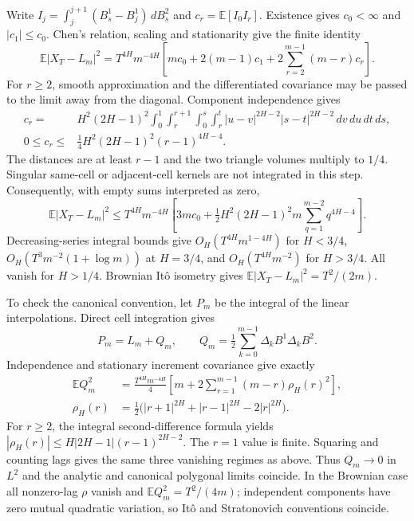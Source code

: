 \documentclass[11pt]{article}
\newcommand{\E}{\mathbb E}
\begin{document}
Write $I_j=\int_j^{j+1}(B^1_s-B^1_j)\,dB^2_s$ and $c_r=\E[I_0I_r]$. Existence gives $c_0<\infty$ and $|c_1|\le c_0$. Chen's relation, scaling and stationarity give the finite identity
\begin{equation}
\E|X_T-L_m|^2=T^{4H}m^{-4H}
\left[mc_0+2(m-1)c_1+2\sum_{r=2}^{m-1}(m-r)c_r\right].\label{eq:lag}
\end{equation}
For $r\ge2$, smooth approximation and the differentiated covariance may be passed to the limit away from the diagonal. Component independence gives
\begin{align}
c_r={}&H^2(2H-1)^2\int_0^1\int_r^{r+1}\int_0^s\int_r^t
|u-v|^{2H-2}|s-t|^{2H-2}\,dv\,du\,dt\,ds,\nonumber\\
0\le c_r\le{}&\tfrac14H^2(2H-1)^2(r-1)^{4H-4}.\label{eq:separated}
\end{align}
The distances are at least $r-1$ and the two triangle volumes multiply to $1/4$. Singular same-cell or adjacent-cell kernels are not integrated in this step. Consequently, with empty sums interpreted as zero,
\begin{equation}
\E|X_T-L_m|^2\le T^{4H}m^{-4H}
\left[3mc_0+\tfrac12H^2(2H-1)^2m\sum_{q=1}^{m-2}q^{4H-4}\right].\label{eq:coarse}
\end{equation}
Decreasing-series integral bounds give $O_H(T^{4H}m^{1-4H})$ for $H<3/4$, $O_H(T^3m^{-2}(1+\log m))$ at $H=3/4$, and $O_H(T^{4H}m^{-2})$ for $H>3/4$. All vanish for $H>1/4$. Brownian It\^o isometry gives $\E|X_T-L_m|^2=T^2/(2m)$.

To check the canonical convention, let $P_m$ be the integral of the linear interpolations. Direct cell integration gives
\begin{equation}
P_m=L_m+Q_m,\qquad Q_m=\tfrac12\sum_{k=0}^{m-1}\Delta_k B^1\Delta_k B^2.\label{eq:polygon}
\end{equation}
Independence and stationary increment covariance give exactly
\begin{align}
\E Q_m^2&=\frac{T^{4H}m^{-4H}}4
\left[m+2\sum_{r=1}^{m-1}(m-r)\rho_H(r)^2\right],\label{eq:correction}\\
\rho_H(r)&=\tfrac12\bigl(|r+1|^{2H}+|r-1|^{2H}-2|r|^{2H}\bigr).\nonumber
\end{align}
For $r\ge2$, the integral second-difference formula yields
$|\rho_H(r)|\le H|2H-1|(r-1)^{2H-2}$. The $r=1$ value is finite. Squaring and counting lags gives the same three vanishing regimes as above. Thus $Q_m\to0$ in $L^2$ and the analytic and canonical polygonal limits coincide. In the Brownian case all nonzero-lag $\rho$ vanish and $\E Q_m^2=T^2/(4m)$; independent components have zero mutual quadratic variation, so It\^o and Stratonovich conventions coincide.
\end{document}
